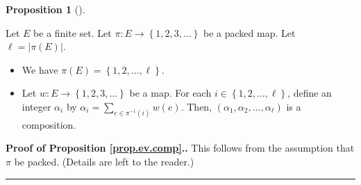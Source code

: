 \documentclass[numbers=enddot,12pt,final,onecolumn,notitlepage,abstracton]{scrartcl}
\theoremstyle{definition}
\newtheorem{prop}[theo]{Proposition}
\newenvironment{proposition}[1][]
{\begin{prop}[#1]\begin{leftbar}}
{\end{leftbar}\end{prop}}
\newenvironment{proof}[1][Proof]{\noindent\textbf{#1.} }{\ \rule{0.5em}{0.5em}}
\let\sumnonlimits\sum
\renewcommand{\sum}{\sumnonlimits\limits}
\newenvironment{vershort}{}{}
\begin{document}
\begin{proposition}
\label{prop.ev.comp}
Let $E$ be a finite set.
Let $\pi : E \to \left\{1, 2, 3, \ldots\right\}$ be a packed map.
Let $\ell = \left|\pi\left(E\right)\right|$.

\begin{itemize}
\item[(a)] We have $\pi\left(E\right) = \left\{1, 2, \ldots, \ell\right\}$.

\item[(b)] Let $w : E \to \left\{1, 2, 3, \ldots\right\}$ be a
map. For each $i \in \left\{1, 2, \ldots, \ell\right\}$, define an
integer $\alpha_i$ by $\alpha_i = \sum_{e \in \pi^{-1}\left(i\right)}
w\left(e\right)$. Then,
$\left(\alpha_1, \alpha_2, \ldots, \alpha_\ell\right)$ is a
composition.
\end{itemize}
\end{proposition}

\begin{vershort}
\begin{proof}[Proof of Proposition \ref{prop.ev.comp}.]
This follows from the assumption that $\pi$ be packed. (Details
are left to the reader.)
\end{proof}
\end{vershort}
\end{document}
